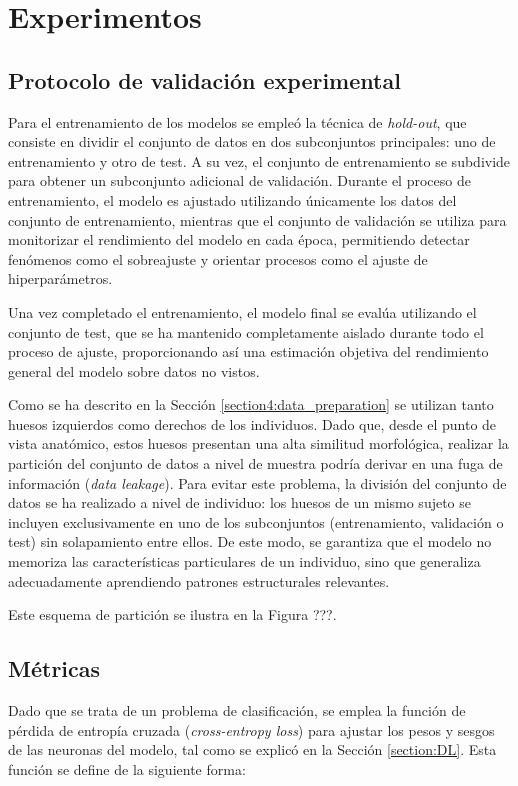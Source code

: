 \chapter{Experimentos}
\section{Protocolo de validación experimental}
Para el entrenamiento de los modelos se empleó la técnica de \textit{hold-out}, que consiste en dividir el conjunto de datos en dos subconjuntos principales: uno de entrenamiento y otro de test. A su vez, el conjunto de entrenamiento se subdivide para obtener un subconjunto adicional de validación. Durante el proceso de entrenamiento, el modelo es ajustado utilizando únicamente los datos del conjunto de entrenamiento, mientras que el conjunto de validación se utiliza para monitorizar el rendimiento del modelo en cada época, permitiendo detectar fenómenos como el sobreajuste y orientar procesos como el ajuste de hiperparámetros.

Una vez completado el entrenamiento, el modelo final se evalúa utilizando el conjunto de test, que se ha mantenido completamente aislado durante todo el proceso de ajuste, proporcionando así una estimación objetiva del rendimiento general del modelo sobre datos no vistos.

Como se ha descrito en la Sección \ref{section4:data_preparation} se utilizan tanto huesos izquierdos como derechos de los individuos. Dado que, desde el punto de vista anatómico, estos huesos presentan una alta similitud morfológica, realizar la partición del conjunto de datos a nivel de muestra podría derivar en una fuga de información (\textit{data leakage}). Para evitar este problema, la división del conjunto de datos se ha realizado a nivel de individuo: los huesos de un mismo sujeto se incluyen exclusivamente en uno de los subconjuntos (entrenamiento, validación o test) sin solapamiento entre ellos. De este modo, se garantiza que el modelo no memoriza las características particulares de un individuo, sino que generaliza adecuadamente aprendiendo patrones estructurales relevantes.

Este esquema de partición se ilustra en la Figura ???.
\section{Métricas}
Dado que se trata de un problema de clasificación, se emplea la función de pérdida de entropía cruzada (\textit{cross-entropy loss}) para ajustar los pesos y sesgos de las neuronas del modelo, tal como se explicó en la Sección \ref{section:DL}. Esta función se define de la siguiente forma:

